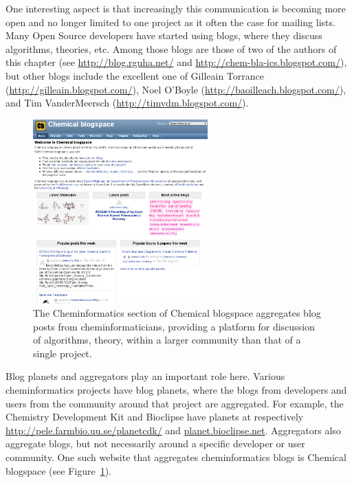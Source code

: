 \documentclass[11pt]{book}
\begin{document}
One interesting aspect is that increasingly this communication
is becoming more open and no longer limited to one project as
it often the case for mailing lists. Many Open Source developers
have started using blogs, where they discuss algorithms, theories,
etc. Among those blogs are those of two of the authors of this
chapter (see \url{http://blog.rguha.net/} and
\url{http://chem-bla-ics.blogspot.com/}),
but other blogs include the excellent one of
Gilleain Torrance (\url{http://gilleain.blogspot.com/}),
Noel O'Boyle (\url{http://baoilleach.blogspot.com/}), and
Tim VanderMeersch (\url{http://timvdm.blogspot.com/}).

\begin{figure}[bt]
\begin{center}
\includegraphics[width=0.6\textwidth]{graphics/cb.png}
\end{center}
\caption{The Cheminformatics section of Chemical blogspace
aggregates blog posts from cheminformaticians, providing
a platform for discussion of algorithms, theory, within
a larger community than that of a single project.}
\label{fig:cb}
\end{figure}

Blog planets and aggregators play an important role here.
Various cheminformatics projects have blog planets, where
the blogs from developers and users from the community
around that project are aggregated. For example, the
Chemistry Development Kit and Bioclipse have planets
at respectively \url{http://pele.farmbio.uu.se/planetcdk/} and
\url{planet.bioclipse.net}.
Aggregators also aggregate blogs, but not necessarily around
a specific developer or user community. One such website
that aggregates cheminformatics blogs is Chemical blogspace
(see Figure~\ref{fig:cb}).
\end{document}
